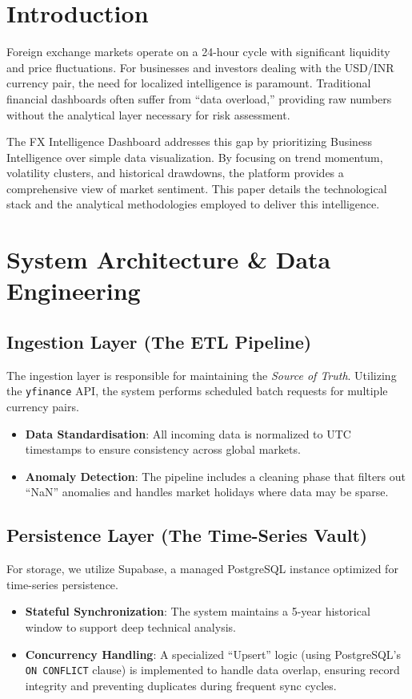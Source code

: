 \documentclass[conference]{IEEEtran}
\begin{document}
\section{Introduction}
Foreign exchange markets operate on a 24-hour cycle with significant liquidity and price fluctuations. For businesses and investors dealing with the USD/INR currency pair, the need for localized intelligence is paramount. Traditional financial dashboards often suffer from ``data overload,'' providing raw numbers without the analytical layer necessary for risk assessment. 

The FX Intelligence Dashboard addresses this gap by prioritizing Business Intelligence over simple data visualization. By focusing on trend momentum, volatility clusters, and historical drawdowns, the platform provides a comprehensive view of market sentiment. This paper details the technological stack and the analytical methodologies employed to deliver this intelligence.

\section{System Architecture \& Data Engineering}

\subsection{Ingestion Layer (The ETL Pipeline)}
The ingestion layer is responsible for maintaining the \emph{Source of Truth}. Utilizing the \texttt{yfinance} API, the system performs scheduled batch requests for multiple currency pairs. 
\begin{itemize}
    \item \textbf{Data Standardisation}: All incoming data is normalized to UTC timestamps to ensure consistency across global markets.
    \item \textbf{Anomaly Detection}: The pipeline includes a cleaning phase that filters out ``NaN'' anomalies and handles market holidays where data may be sparse.
\end{itemize}

\subsection{Persistence Layer (The Time-Series Vault)}
For storage, we utilize Supabase, a managed PostgreSQL instance optimized for time-series persistence.
\begin{itemize}
    \item \textbf{Stateful Synchronization}: The system maintains a 5-year historical window to support deep technical analysis.
    \item \textbf{Concurrency Handling}: A specialized ``Upsert'' logic (using PostgreSQL's \texttt{ON CONFLICT} clause) is implemented to handle data overlap, ensuring record integrity and preventing duplicates during frequent sync cycles.
\end{itemize}
\end{document}
